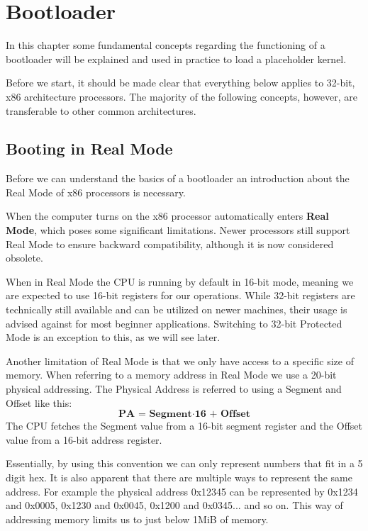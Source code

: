 \chapter{Bootloader}

In this chapter some fundamental concepts regarding the functioning of a bootloader will be explained and used in practice 
to load a placeholder kernel.

Before we start, it should be made clear that everything below applies to 32-bit, x86 architecture processors.
The majority of the following concepts, however, are transferable to other common architectures.

\section{Booting in Real Mode}

Before we can understand the basics of a bootloader an introduction about the Real Mode of x86 processors is necessary.

When the computer turns on the x86 processor automatically enters \textbf{Real Mode}, which poses some significant limitations.
Newer processors still support Real Mode to ensure backward compatibility, although it is now considered obsolete.

When in Real Mode the CPU is running by default in 16-bit mode, meaning we are expected to use 16-bit registers for our operations.
While 32-bit registers are technically still available and can be utilized on newer machines, their usage is advised against 
for most beginner applications. Switching to 32-bit Protected Mode is an exception to this, as we will see later.

Another limitation of Real Mode is that we only have access to a specific size of memory. When referring to a memory 
address in Real Mode we use a 20-bit physical addressing. The Physical Address is referred to using a Segment and Offset like this: 
\[
\textbf{PA = Segment} \cdot \textbf{16 + Offset}
\]
The CPU fetches the Segment value from a 16-bit segment register and the Offset value from a 16-bit address register.

Essentially, by using this convention we can only represent numbers that fit in a 5 digit hex. It is also apparent that
there are multiple ways to represent the same address. For example the physical address 0x12345 can be represented 
by 0x1234 and 0x0005, 0x1230 and 0x0045, 0x1200 and 0x0345... and so on. This way of addressing memory limits us to just 
below 1MiB of memory.

